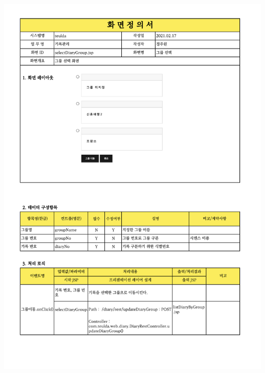 {{{{{{{{{{{{{{{{{{{{{{{{{{{{{{{{{{{{{{{{\includegraphics[width=20cm]{./Figure/Design/Display/diary/diary_22.pdf} \\
}}}}}}}}}}}}}}}}}}}}}}}}}}}}}}}}}}}}}}}}
